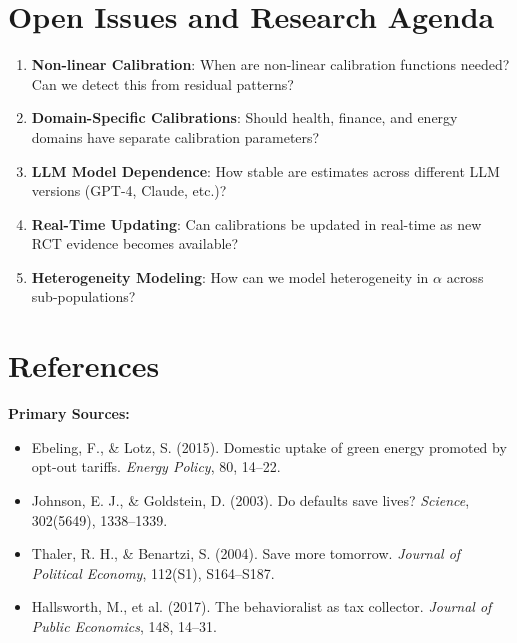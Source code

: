 
\section{Open Issues and Research Agenda}
\label{sec:iii-open-issues}

\begin{enumerate}
\item \textbf{Non-linear Calibration}: When are non-linear calibration functions
needed? Can we detect this from residual patterns?

\item \textbf{Domain-Specific Calibrations}: Should health, finance, and energy
domains have separate calibration parameters?

\item \textbf{LLM Model Dependence}: How stable are estimates across different
LLM versions (GPT-4, Claude, etc.)?

\item \textbf{Real-Time Updating}: Can calibrations be updated in real-time as
new RCT evidence becomes available?

\item \textbf{Heterogeneity Modeling}: How can we model heterogeneity in $\alpha$
across sub-populations?
\end{enumerate}


\section{References}
\label{sec:iii-references}

\textbf{Primary Sources:}
\begin{itemize}[nosep]
\item Ebeling, F., \& Lotz, S. (2015). Domestic uptake of green energy promoted by opt-out tariffs. \emph{Energy Policy}, 80, 14--22.
\item Johnson, E. J., \& Goldstein, D. (2003). Do defaults save lives? \emph{Science}, 302(5649), 1338--1339.
\item Thaler, R. H., \& Benartzi, S. (2004). Save more tomorrow. \emph{Journal of Political Economy}, 112(S1), S164--S187.
\item Hallsworth, M., et al. (2017). The behavioralist as tax collector. \emph{Journal of Public Economics}, 148, 14--31.
\end{itemize}

